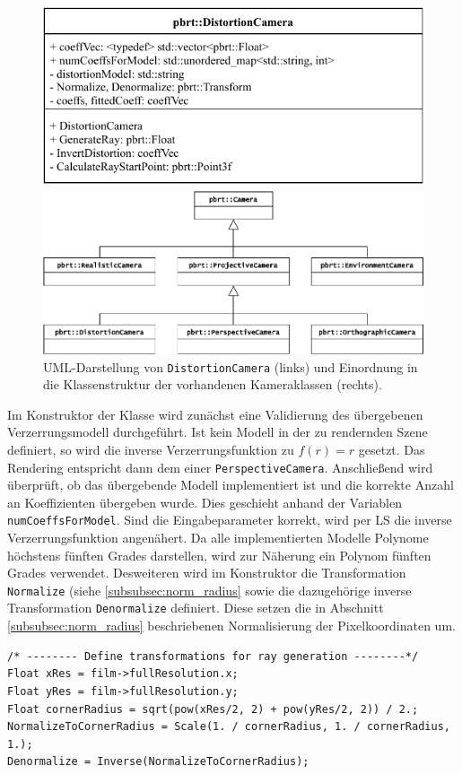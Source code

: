 \begin{figure}[h]
	\begin{minipage}{.5\textwidth}
		\centering
		\includegraphics[height=.4\columnwidth]{uml_distortioncam}
	\end{minipage}
	\begin{minipage}{.5\textwidth}
		\centering
		\includegraphics[height=.4\columnwidth]{uml_classes}
	\end{minipage}
	\caption{UML-Darstellung von \texttt{DistortionCamera} (links) und Einordnung in die Klassenstruktur der vorhandenen Kameraklassen (rechts).}
	\label{fig:uml}
\end{figure}

Im Konstruktor der Klasse wird zunächst eine Validierung des übergebenen Verzerrungsmodell durchgeführt. Ist kein Modell in der zu rendernden Szene definiert, so wird die inverse Verzerrungsfunktion zu $f(r) = r$ gesetzt. Das Rendering entspricht dann dem einer \texttt{PerspectiveCamera}. Anschließend wird überprüft, ob das übergebende Modell implementiert ist und die korrekte Anzahl an Koeffizienten übergeben wurde. Dies geschieht anhand der Variablen \texttt{numCoeffsForModel}. Sind die Eingabeparameter korrekt, wird per LS die inverse Verzerrungsfunktion angenähert. Da alle implementierten Modelle Polynome höchstens fünften Grades darstellen, wird zur Näherung ein Polynom fünften Grades verwendet. 
Desweiteren wird im Konstruktor die Transformation \texttt{Normalize} (siehe \ref{subsubsec:norm_radius} sowie die dazugehörige inverse Transformation \texttt{Denormalize} definiert. Diese setzen die in Abschnitt \ref{subsubsec:norm_radius} beschriebenen Normalisierung der Pixelkoordinaten um.
\begin{lstlisting}[caption={Transformation zur Normalisierung der Pixelkoordinaten}]
/* -------- Define transformations for ray generation --------*/
Float xRes = film->fullResolution.x;
Float yRes = film->fullResolution.y;
Float cornerRadius = sqrt(pow(xRes/2, 2) + pow(yRes/2, 2)) / 2.;
NormalizeToCornerRadius = Scale(1. / cornerRadius, 1. / cornerRadius, 1.);
Denormalize = Inverse(NormalizeToCornerRadius);
\end{lstlisting}

